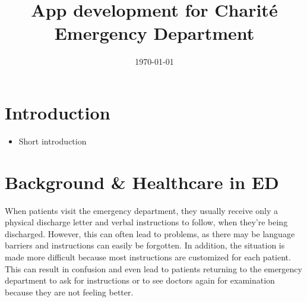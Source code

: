\documentclass[]{report}
\title{App development for Charité Emergency Department}
\author{}
\date{\today}
\begin{document}
\maketitle

\section{Introduction}
\begin{itemize}
    \item Short introduction
\end{itemize}

\section{Background \& Healthcare in ED}
When patients visit the emergency department, they usually receive only a physical discharge letter and verbal instructions to follow, when they're being discharged. However, this can often lead to problems, as there may be language barriers and instructions can easily be forgotten. In addition, the situation is made more difficult because most instructions are customized for each patient. This can result in confusion and even lead to patients returning to the emergency department to ask for instructions or to see doctors again for examination because they are not feeling better.
\end{document}
